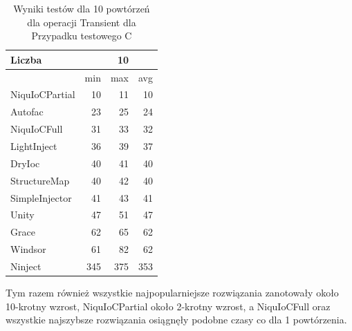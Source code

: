 \documentclass[12pt]{article}
\begin{document}
\begin{table}[H]
\captionsetup{belowskip=0pt,aboveskip=0pt}
\begin{center}
\begin{small}
	\begin{tabular}{ | l | r r r | }
    		\hline
Liczba & & 10 & \\ \hline
 & min & max & avg \\ \hline
NiquIoCPartial & 10 & 11 & 10 \\ \hline
Autofac & 23 & 25 & 24 \\ \hline
NiquIoCFull & 31 & 33 & 32 \\ \hline
LightInject & 36 & 39 & 37 \\ \hline
DryIoc & 40 & 41 & 40 \\ \hline
StructureMap & 40 & 42 & 40 \\ \hline
SimpleInjector & 41 & 43 & 41 \\ \hline
Unity & 47 & 51 & 47 \\ \hline
Grace & 62 & 65 & 62 \\ \hline
Windsor & 61 & 82 & 62 \\ \hline
Ninject & 345 & 375 & 353 \\ \hline
  	\end{tabular}
\end{small}
\end{center}
\caption{Wyniki testów dla 10 powtórzeń dla operacji Transient dla Przypadku testowego C}
\label{TestCaseC_Transient10}
\end{table}
Tym razem również wszystkie najpopularniejsze rozwiązania zanotowały około 10-krotny wzrost, NiquIoCPartial około 2-krotny wzrost, a NiquIoCFull oraz wszystkie najszybsze rozwiązania osiągnęły podobne czasy co dla 1 powtórzenia.
\\ \\
\end{document}
